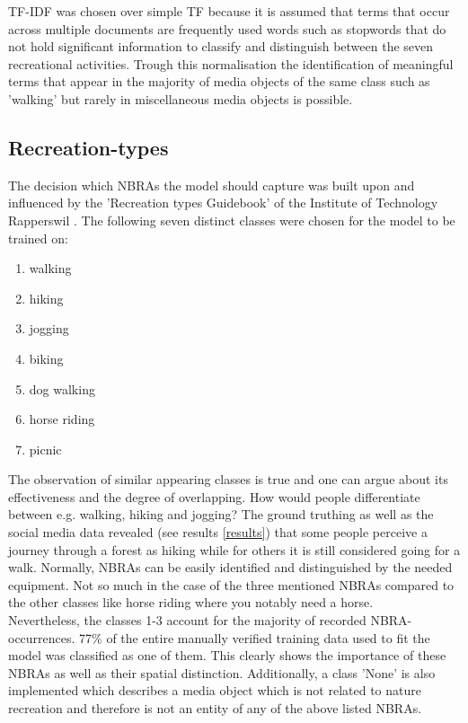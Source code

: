 TF-IDF was chosen over simple TF because it is assumed that terms that occur across multiple documents are frequently used words such as stopwords that do not hold significant information to classify and distinguish between the seven recreational activities. Trough this normalisation the identification of meaningful terms that appear in the majority of media objects of the same class such as 'walking' but rarely in miscellaneous media objects is possible. 


\subsection{Recreation-types} \label{recreation_types}
The decision which NBRAs the model should capture was built upon and influenced by the 'Recreation types Guidebook' of the Institute of Technology Rapperswil \parencite{IFL2018}. The following seven distinct classes were chosen for the model to be trained on:
\begin{enumerate}
    \item walking
    \item hiking
    \item jogging
    \item biking
    \item dog walking
    \item horse riding
    \item picnic
\end{enumerate}
The observation of similar appearing classes is true and one can argue about its effectiveness and the degree of overlapping. How would people differentiate between e.g. walking, hiking and jogging? The ground truthing as well as the social media data revealed (see results \ref{results}) that some people perceive a journey through a forest as hiking while for others it is still considered going for a walk. Normally, NBRAs can be easily identified and distinguished by the needed equipment. Not so much in the case of the three mentioned NBRAs compared to the other classes like horse riding where you notably need a horse.\\
Nevertheless, the classes 1-3 account for the majority of recorded NBRA-occurrences. 77\% of the entire manually verified training data used to fit the model was classified as one of them. This clearly shows the importance of these NBRAs as well as their spatial distinction.
Additionally, a class 'None' is also implemented which describes a media object which is not related to nature recreation and therefore is not an entity of any of the above listed NBRAs.\\

